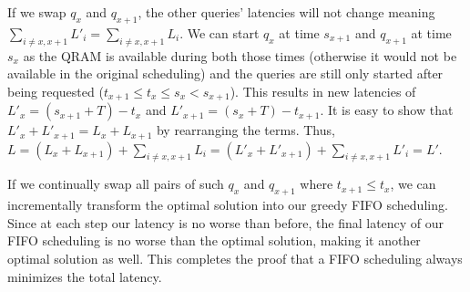 If we swap $q_x$ and $q_{x + 1}$, the other queries' latencies will not change meaning $\sum_{i \neq x, x + 1} L'_i = \sum_{i \neq x, x + 1} L_i$. We can start $q_x$ at time $s_{x + 1}$ and $q_{x + 1}$ at time $s_x$ as the QRAM is available during both those times (otherwise it would not be available in the original scheduling) and the queries are still only started after being requested ($t_{x + 1} \leq t_x \leq s_{x} < s_{x + 1}$). This results in new latencies of $L'_x = (s_{x + 1} + T) - t_x$ and $L'_{x + 1} = (s_x + T) - t_{x + 1}$. It is easy to show that $L'_x + L'_{x + 1} = L_x + L_{x + 1}$ by rearranging the terms. Thus, $L = (L_x + L_{x + 1}) + \sum_{i \neq x, x + 1} L_i = (L'_x + L'_{x + 1}) + \sum_{i \neq x, x + 1} L'_i = L'$.


If we continually swap all pairs of such $q_x$ and $q_{x + 1}$ where $t_{x + 1} \leq t_x$, we can incrementally transform the optimal solution into our greedy FIFO scheduling. Since at each step our latency is no worse than before, the final latency of our FIFO scheduling is no worse than the optimal solution, making it another optimal solution as well. This completes the proof that a FIFO scheduling always minimizes the total latency.


